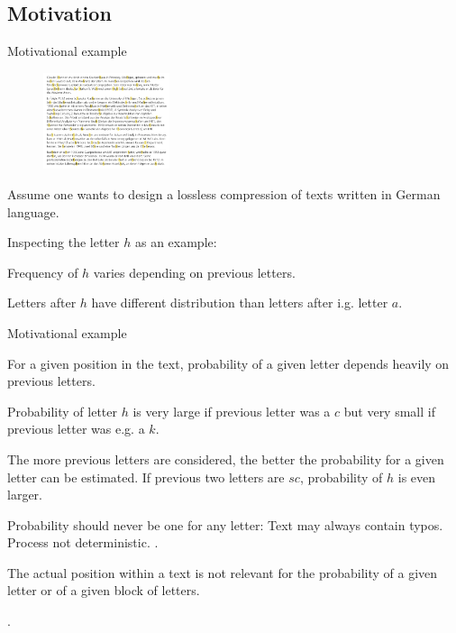 \subsection{Motivation}

\begin{frame}{Motivational example}
\begin{figure}
\centering
\includegraphics[width=0.33\textwidth]{Lossless_II/Shannon_Bio.png}
\end{figure}
\bit
\item Assume one wants to design a lossless compression of texts written in German language.
\item Inspecting the letter $h$ as an example: 
\bit 
\item Frequency of $h$ varies depending on previous letters. 
\item Letters after $h$ have different distribution than letters after i.g. letter $a$. 
\eit 
\eit
\end{frame}



\begin{frame}{Motivational example}

\begin{minipage}[t]{0.8\linewidth}
 For a given position in the text,  probability of a given letter depends heavily 
on previous letters.
\bit\small
\item Probability of letter $h$ is very large if previous letter was a $c$ but very small if previous letter was e.g. a $k$. 
\item The more previous letters are considered, the better the probability for a given letter can be estimated. If previous
two letters are $sc$, probability of $h$ is even larger.  
\item Probability should never be one for any letter: Text may always contain typos. Process not deterministic.
\eit
 . 
\end{minipage}

\begin{minipage}[t]{0.8\linewidth}
 The actual position within a text is not relevant for the probability of a given letter 
or of a given block of letters.

\smallskip
{}.
\end{minipage}

\end{frame}


